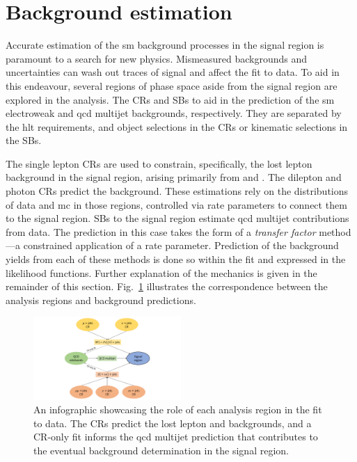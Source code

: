 \section{Background estimation}
\label{sec:htoinv_background_estimation}

Accurate estimation of the \acrlong{sm} background processes in the signal region is paramount to a search for new physics. Mismeasured backgrounds and uncertainties can wash out traces of signal and affect the fit to data. To aid in this endeavour, several regions of phase space aside from the signal region are explored in the analysis. The \glspl{CR} and \glspl{SB} to aid in the prediction of the \acrshort{sm} electroweak and \acrshort{qcd} multijet backgrounds, respectively. They are separated by the \acrlong{hlt} requirements, and object selections in the \glspl{CR} or kinematic selections in the \glspl{SB}.

The single lepton \glspl{CR} are used to constrain, specifically, the lost lepton background in the signal region, arising primarily from \ttbarpjets and \wtolnupjets. The dilepton and photon \glspl{CR} predict the \ztonunu background. These estimations rely on the distributions of data and \acrlong{mc} in those regions, controlled via rate parameters to connect them to the signal region. \Glspl{SB} to the signal region estimate \acrshort{qcd} multijet contributions from data. The prediction in this case takes the form of a \emph{transfer factor} method---a constrained application of a rate parameter. Prediction of the background yields from each of these methods is done so within the fit and expressed in the likelihood functions. Further explanation of the mechanics is given in the remainder of this section. Fig.~\ref{fig:htoinv_fit_overview} illustrates the correspondence between the analysis regions and background predictions.

\begin{figure}[htbp]
    \centering
    \includegraphics[width=0.5\textwidth]{figures/fit_overview.pdf}
    \caption[An infographic showcasing the role of each analysis region in the fit to data]{An infographic showcasing the role of each analysis region in the fit to data. The \glspl{CR} predict the lost lepton and \ztonunu backgrounds, and a \gls{CR}-only fit informs the \acrshort{qcd} multijet prediction that contributes to the eventual background determination in the signal region.}
    \label{fig:htoinv_fit_overview}
\end{figure}



